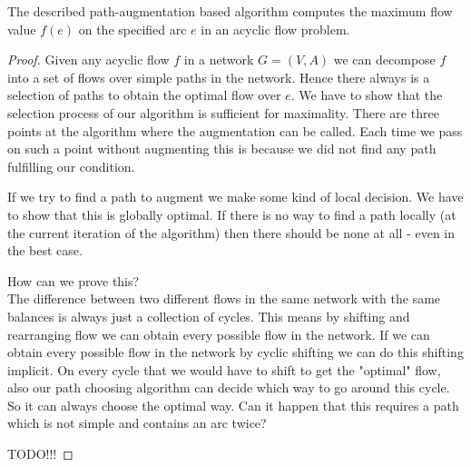 \begin{prop}
 The described path-augmentation based algorithm computes the maximum flow value $f(e)$ on the specified arc $e$ in an 
acyclic flow problem.
\end{prop}
\begin{proof}
 Given any acyclic flow $f$ in a network $G=(V,A)$ we can decompose $f$ into a set of flows over simple paths in the 
 network. Hence there always is a selection of paths to obtain the optimal flow over $e$. 
 We have to show that the selection process of our algorithm is sufficient for maximality. There are three points at 
 the algorithm where the augmentation can be called. Each time we pass on such a point without augmenting this is 
 because we did not find any path fulfilling our condition.
 
 If we try to find a path to augment we make some kind of local decision. We have to show that this is globally 
 optimal. If there is no way to find a path locally (at the current iteration of the algorithm) then there should be 
 none at all - even in the best case.
 
 How can we prove this? \\
 
 The difference between two different flows in the same network with the same balances is always just a collection of 
cycles. This means by shifting and rearranging flow we can obtain every possible flow in the network. If we can obtain 
every possible flow in the network by cyclic shifting we can do this shifting implicit. On every cycle that we would 
have to shift to get the "optimal" flow, also our path choosing algorithm can decide which way to go around this cycle. 
So it can always choose the optimal way.
Can it happen that this requires a path which is not simple and contains an arc twice? 

 
 
%  

 
 TODO!!!
\end{proof}





